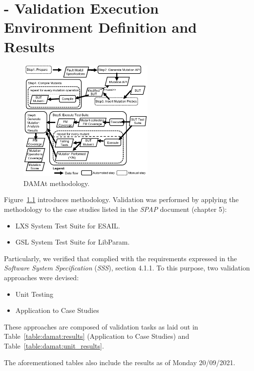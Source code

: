 
\chapter{\DAMA - Validation Execution Environment Definition and Results}

\begin{figure}[h]
  \centering
  \includegraphics[width=0.6\textwidth]{images/dataDrivenBufferProcess.pdf}
      \caption{DAMAt methodology.}
      \label{fig:damat}
\end{figure}

Figure~\ref{fig:damat} introduces \DAMA methodology.
Validation was performed by applying the \DAMA methodology to the case studies listed in the \emph{SPAP} document (chapter 5):
\begin{itemize}
  \item LXS System Test Suite for ESAIL.
  \item GSL System Test Suite for LibParam.
\end{itemize}

\STARTCHANGEDFINAL

Particularly, we verified that \DAMA complied with the requirements expressed in the \emph{Software System Specification} (\emph{SSS}), section 4.1.1.
To this purpose, two validation approaches were devised:
\begin{itemize}
  \item Unit Testing
  \item Application to Case Studies
\end{itemize}

These approaches are composed of validation tasks as laid out in Table~\ref{table:damat:results} (Application to Case Studies) and Table~\ref{table:damat:unit_results}.

The aforementioned tables also include the results as of Monday 20/09/2021.

